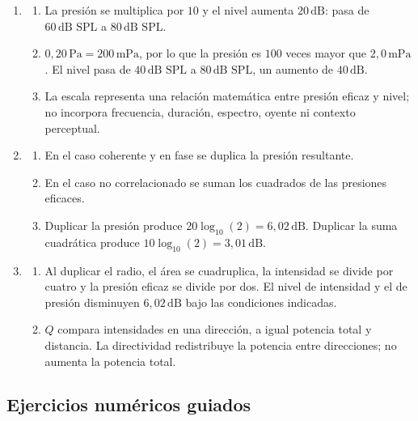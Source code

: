 \begin{enumerate}[label=\textbf{R\arabic*.},leftmargin=*]
    \item
    \begin{enumerate}[label=\alph*)]
        \item La presión se multiplica por \(10\) y el nivel aumenta
        \(20\,\text{dB}\): pasa de \(60\,\text{dB SPL}\) a
        \(80\,\text{dB SPL}\).
        \item \(0{,}20\,\text{Pa}=200\,\text{mPa}\), por lo que la presión es
        \(100\) veces mayor que \(2{,}0\,\text{mPa}\). El nivel pasa de
        \(40\,\text{dB SPL}\) a \(80\,\text{dB SPL}\), un aumento de
        \(40\,\text{dB}\).
        \item La escala representa una relación matemática entre presión
        eficaz y nivel; no incorpora frecuencia, duración, espectro, oyente ni
        contexto perceptual.
    \end{enumerate}

    \item
    \begin{enumerate}[label=\alph*)]
        \item En el caso coherente y en fase se duplica la presión resultante.
        \item En el caso no correlacionado se suman los cuadrados de las
        presiones eficaces.
        \item Duplicar la presión produce
        \(20\log_{10}(2)=6{,}02\,\text{dB}\). Duplicar la suma cuadrática
        produce \(10\log_{10}(2)=3{,}01\,\text{dB}\).
    \end{enumerate}

    \item
    \begin{enumerate}[label=\alph*)]
        \item Al duplicar el radio, el área se cuadruplica, la intensidad se
        divide por cuatro y la presión eficaz se divide por dos. El nivel de
        intensidad y el de presión disminuyen
        \(6{,}02\,\text{dB}\) bajo las condiciones indicadas.
        \item \(Q\) compara intensidades en una dirección, a igual potencia
        total y distancia. La directividad redistribuye la potencia entre
        direcciones; no aumenta la potencia total.
    \end{enumerate}
\end{enumerate}

\subsection*{Ejercicios numéricos guiados}

